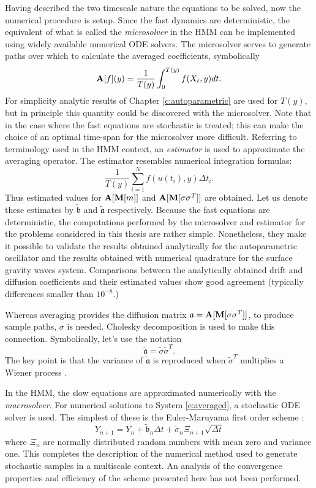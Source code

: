 Having described the two timescale nature the equations to be solved, now the numerical procedure is setup. Since the fast dynamics are deterministic, the equivalent of what is called the \emph{microsolver} in the HMM can be implemented using widely available numerical ODE solvers. The microsolver serves to generate paths over which to calculate the averaged coefficients, symbolically
\[
\operatorname{\mathbf A}[f](y) = \frac{1}{T(y)} \int_0^{T(y)} f(X_t, y) dt.
\]
For simplicity analytic results of Chapter \ref{c:autoparametric} are used for $T(y)$, but in principle this quantity could be discovered with the microsolver. Note that in \citet{e05:_analy} the case where the fast equations are stochastic is treated; this can make the choice of an optimal time-span for the microsolver more difficult. Referring to terminology used in the HMM context, an \emph{estimator} is used to approximate the averaging operator. The estimator resembles numerical integration formulas:
\[
\frac{1}{T(y)} \sum_{i=1}^N f(u(t_i),y) \Delta t_i.
\]
Thus estimated values for $\operatorname{\mathbf A}[\operatorname{\mathbf M}[m]]$ and $\operatorname{\mathbf A}[\operatorname{\mathbf M}[\sigma \sigma^T]]$ are obtained. Let us denote these estimates by $\tilde{\mathfrak b}$ and $\tilde{\mathfrak a}$ respectively. Because the fast equations are deterministic, the computations performed by the microsolver and estimator for the problems considered in this thesis are rather simple. Nonetheless, they make it possible to validate the results obtained analytically for the autoparametric oscillator and the results obtained with numerical quadrature for the surface gravity waves system. Comparisons between the analytically obtained drift and diffusion coefficients and their estimated values show good agreement (typically differences smaller than $10^{-8}$.)

Whereas averaging provides the diffusion matrix $\mathfrak{a} = \operatorname{\mathbf A}[\operatorname{\mathbf M}[\sigma \sigma^T]]$, to produce sample paths, $\sigma$ is needed. Cholesky decomposition is used to make this connection. Symbolically, let's use the notation
\[
\tilde{\mathfrak a} = \tilde \sigma \tilde \sigma^T.
\]
The key point is that the variance of $\tilde{\mathfrak a}$ is reproduced when $\tilde \sigma^T$ multiplies a Wiener process \citep{law82:_simul}.

In the HMM, the slow equations are approximated numerically with the \emph{macrosolver}. For numerical solutions to System \eqref{e:averaged}, a stochastic ODE solver is used. The simplest of these is the Euler-Maruyama first order scheme \citep{kloeden92:_numer_solut_stoch_differ_equat}:
\[
Y_{n+1} = Y_n + \tilde{\mathfrak b}_n \Delta t + \tilde \sigma_n \Xi_{n+1} \sqrt{\Delta t}
\]
where $\Xi_n$ are normally distributed random numbers with mean zero and variance one. This completes the description of the numerical method used to generate stochastic samples in a multiscale context. An analysis of the convergence properties and efficiency of the scheme presented here has not been performed.

